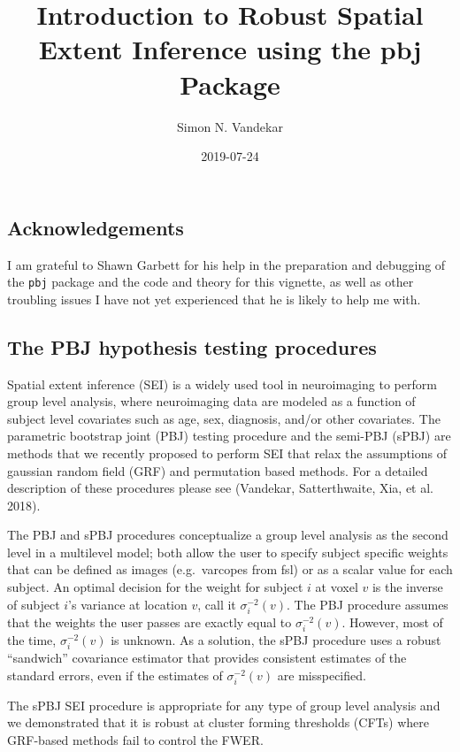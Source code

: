 \documentclass[]{article}
\title{Introduction to Robust Spatial Extent Inference using the pbj Package}
\author{Simon N. Vandekar}
\date{2019-07-24}
\begin{document}
\maketitle

\hypertarget{acknowledgements}{%
\subsection{Acknowledgements}\label{acknowledgements}}

I am grateful to Shawn Garbett for his help in the preparation and
debugging of the \texttt{pbj} package and the code and theory for this
vignette, as well as other troubling issues I have not yet experienced
that he is likely to help me with.

\hypertarget{the-pbj-hypothesis-testing-procedures}{%
\subsection{The PBJ hypothesis testing
procedures}\label{the-pbj-hypothesis-testing-procedures}}

Spatial extent inference (SEI) is a widely used tool in neuroimaging to
perform group level analysis, where neuroimaging data are modeled as a
function of subject level covariates such as age, sex, diagnosis, and/or
other covariates. The parametric bootstrap joint (PBJ) testing procedure
and the semi-PBJ (sPBJ) are methods that we recently proposed to perform
SEI that relax the assumptions of gaussian random field (GRF) and
permutation based methods. For a detailed description of these
procedures please see (Vandekar, Satterthwaite, Xia, et al. 2018).

The PBJ and sPBJ procedures conceptualize a group level analysis as the
second level in a multilevel model; both allow the user to specify
subject specific weights that can be defined as images (e.g.~varcopes
from fsl) or as a scalar value for each subject. An optimal decision for
the weight for subject \(i\) at voxel \(v\) is the inverse of subject
\(i\)'s variance at location \(v\), call it \(\sigma^{-2}_i(v)\). The
PBJ procedure assumes that the weights the user passes are exactly equal
to \(\sigma^{-2}_i(v)\). However, most of the time, \(\sigma^{-2}_i(v)\)
is unknown. As a solution, the sPBJ procedure uses a robust ``sandwich''
covariance estimator that provides consistent estimates of the standard
errors, even if the estimates of \(\sigma^{-2}_i(v)\) are misspecified.

The sPBJ SEI procedure is appropriate for any type of group level
analysis and we demonstrated that it is robust at cluster forming
thresholds (CFTs) where GRF-based methods fail to control the FWER.
\end{document}
